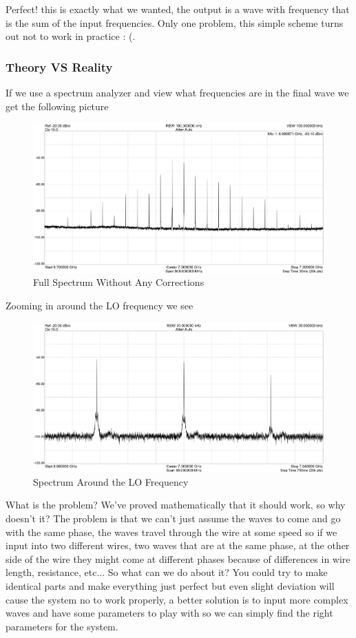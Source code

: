 Perfect! this is exactly what we wanted, the output is a wave with frequency that is the sum of the input frequencies. Only one problem, this simple scheme turns out not to work in practice : (.

\subsubsection{Theory VS Reality} \label{sec:solution_real_world} %
If we use a spectrum analyzer and view what frequencies are in the final wave we get the following picture

\begin{figure}[H]
    \centering
    \includegraphics[width=0.8\columnwidth]{full-spectrum-no-correction.jpg} %
    \caption{Full Spectrum Without Any Corrections}
    \label{fig:Full-spectrum-no-corrections}
\end{figure}
Zooming in around the LO frequency we see
\begin{figure}[H]
    \centering
    \includegraphics[width=0.8\columnwidth]{Important-Spectrum-no-correction.jpg} %
    \caption{Spectrum Around the LO Frequency}
    \label{fig:closeup-spectrum-no-corrections}
\end{figure}

What is the problem? We've proved mathematically that it should work, so why doesn't it? The problem is that we can't just assume the waves to come and go with the same phase, the waves travel through the wire at some speed so if we input into two different wires, two waves that are at the same phase, at the other side of the wire they might come at different phases because of differences in wire length, resistance, etc... So what can we do about it? You could try to make identical parts and make everything just perfect but even slight deviation will cause the system no to work properly, a better solution is to input more complex waves and have some parameters to play with so we can simply find the right parameters for the system.%

